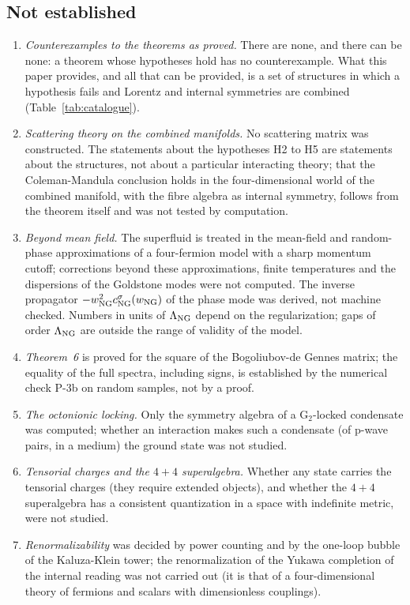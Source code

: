 \subsection{Not established}

\begin{enumerate}
\item \emph{Counterexamples to the theorems as proved.} There are none, and there can be none: a
theorem whose hypotheses hold has no counterexample. What this paper provides, and all that can be
provided, is a set of structures in which a hypothesis fails and Lorentz and internal symmetries are
combined (Table~\ref{tab:catalogue}).
\item \emph{Scattering theory on the combined manifolds.} No scattering matrix was constructed. The
statements about the hypotheses H2 to H5 are statements about the structures, not about a particular
interacting theory; that the Coleman-Mandula conclusion holds in the four-dimensional world of the
combined manifold, with the fibre algebra as internal symmetry, follows from the theorem itself and was
not tested by computation.
\item \emph{Beyond mean field.} The superfluid is treated in the mean-field and random-phase
approximations of a four-fermion model with a sharp momentum cutoff; corrections beyond these
approximations, finite temperatures and the dispersions of the Goldstone modes were not computed. The
inverse propagator $-w_{\rm NG}^2c^\sigma_{\rm NG}(w_{\rm NG})$ of the phase mode was derived, not machine
checked. Numbers in units of $\Lambda_{\rm NG}$ depend on the regularization; gaps of order
$\Lambda_{\rm NG}$ are outside the range of validity of the model.
\item \emph{Theorem~6} is proved for the square of the Bogoliubov-de Gennes matrix; the equality of the
full spectra, including signs, is established by the numerical check P-3b on random samples, not by a
proof.
\item \emph{The octonionic locking.} Only the symmetry algebra of a $\mathrm G_2$-locked condensate was
computed; whether an interaction makes such a condensate (of p-wave pairs, in a medium) the ground state
was not studied.
\item \emph{Tensorial charges and the $4+4$ superalgebra.} Whether any state carries the tensorial
charges (they require extended objects), and whether the $4+4$ superalgebra has a consistent
quantization in a space with indefinite metric, were not studied.
\item \emph{Renormalizability} was decided by power counting and by the one-loop bubble of the
Kaluza-Klein tower; the renormalization of the Yukawa completion of the internal reading was not
carried out (it is that of a four-dimensional theory of fermions and scalars with dimensionless
couplings).
\end{enumerate}
